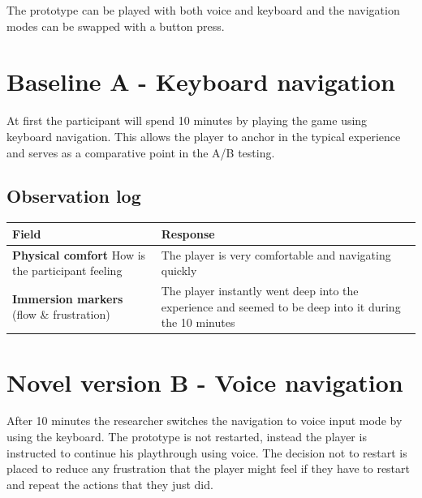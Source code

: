 The prototype can be played with both voice and keyboard and the navigation modes can be swapped with a button press. 

\section{Baseline A - Keyboard navigation}
At first the participant will spend 10 minutes by playing the game using keyboard navigation.
This allows the player to anchor in the typical experience and serves as a comparative point in the A/B testing.

\subsection{Observation log}
\begin{table}[h]
\centering
\begin{tabular}{|p{5cm}|p{10cm}|}
\hline
\textbf{Field} & \textbf{Response} \\ \hline
\textbf{Physical comfort} How is the participant feeling & The player is very comfortable and navigating quickly \\[1.5cm] \hline
\textbf{Immersion markers} (flow \& frustration) & The player instantly went deep into the experience and seemed to be deep into it during the 10 minutes\\[1.5cm] \hline
\end{tabular}
\end{table}

\section{Novel version B - Voice navigation}
After 10 minutes the researcher switches the navigation to voice input mode by using the keyboard. The prototype is not restarted,
instead the player is instructed to continue his playthrough using voice. The decision not to restart is placed to reduce any frustration that the player
might feel if they have to restart and repeat the actions that they just did.

